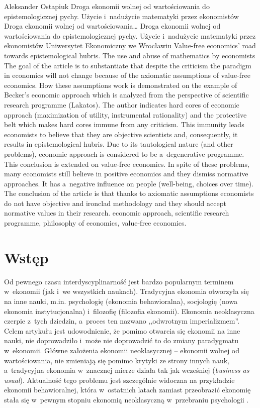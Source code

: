 \begin{artplenv}{Aleksander Ostapiuk}
	{Droga ekonomii wolnej od wartościowania do epistemologicznej pychy. Użycie i~nadużycie matematyki przez
		ekonomistów}
	{Droga ekonomii wolnej od wartościowania\ldots}
	{Droga ekonomii wolnej od wartościowania do epistemologicznej pychy. Użycie i~nadużycie matematyki przez
		ekonomistów}
	{Uniwersytet Ekonomiczny we Wrocławiu\label{ost-start}}
	{Value-free economics' road towards epistemological hubris. The use and abuse of mathematics by economists}
	{The goal of the article is to substantiate that despite the criticism the paradigm in economics will not change because of the axiomatic assumptions of value-free economics. How these assumptions work is demonstrated on the example of Becker's economic approach which is analyzed from the perspective of scientific research programme (Lakatos). The author indicates hard cores of economic approach (maximization of utility, instrumental rationality) and the protective belt which makes hard cores immune from any criticism. This immunity leads economists to believe that they are objective scientists and, consequently, it results in epistemological hubris. Due to its tautological nature (and other problems), economic approach is considered to be a~degenerative programme. This conclusion is extended on value-free economics. In spite of these problems, many economists still believe in positive economics and they dismiss normative approaches. It has a~negative influence on people (well-being, choices over time). The conclusion of the article is that thanks to axiomatic assumptions economists do not have objective and ironclad methodology and they should accept normative values in their research.}
	{economic approach, scientific research programme, philosophy of economics, value-free economics.}



\section*{Wstęp}
\lettrine[loversize=0.13,lines=2,lraise=-0.05,nindent=0em,findent=0.2pt]%
{O}{}d pewnego czasu interdyscyplinarność jest bardzo popularnym terminem w~ekonomii (jak i~we wszystkich naukach).
Tradycyjna ekonomia otworzyła się na inne nauki, m.in. psychologię (ekonomia behawioralna), socjologię (nowa ekonomia
instytucjonalna) i~filozofię (filozofia ekonomii). Ekonomia neoklasyczna czerpie z~tych dziedzin, a~proces ten nazwano
,,odwrotnym imperializmem''. Celem artykułu jest udowodnienie, że pomimo otwarcia się ekonomii na inne nauki, nie
doprowadziło i~może nie doprowadzić to do zmiany paradygmatu
\parencite{kuhn_structure_1962}
w~ekonomii. Główne
założenia ekonomii neoklasycznej -- ekonomii wolnej od wartościowania, nie zmieniają się pomimo krytyki ze strony innych
nauk, a~tradycyjna ekonomia w~znacznej mierze działa tak jak wcześniej (\textit{business as usual}). Aktualność tego
problemu jest szczególnie widoczna na przykładzie ekonomii behawioralnej, która w~ostatnich latach zamiast przeobrazić
ekonomię stała się w~pewnym stopniu ekonomią neoklasyczną w~przebraniu psychologii
\parencite{berg_as-if_2010}.


\end{artplenv}
